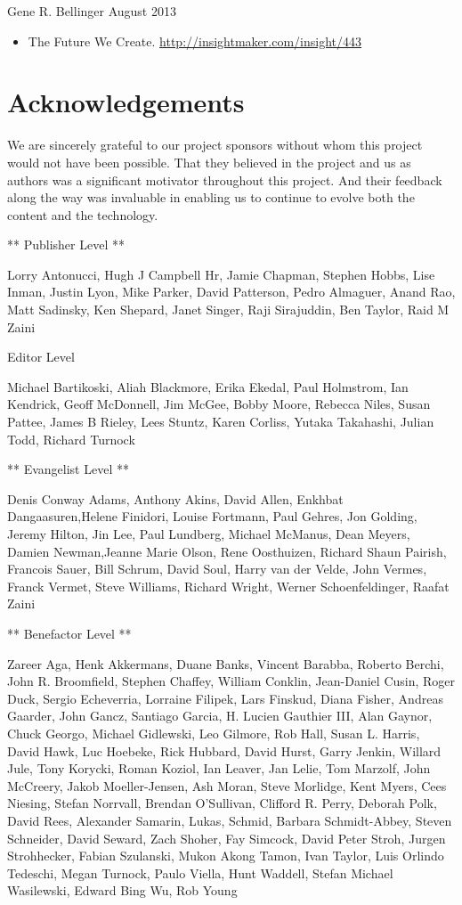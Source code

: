 \documentclass[]{memoir}
\begin{document}
Gene R. Bellinger August 2013

\begin{itemize}
\itemsep1pt\parskip0pt
\item
  The Future We Create. \url{http://insightmaker.com/insight/443}
\end{itemize}

\chapter{Acknowledgements}

We are sincerely grateful to our project sponsors without whom this
project would not have been possible. That they believed in the project
and us as authors was a significant motivator throughout this project.
And their feedback along the way was invaluable in enabling us to
continue to evolve both the content and the technology.

** Publisher Level **

Lorry Antonucci, Hugh J Campbell Hr, Jamie Chapman, Stephen Hobbs, Lise
Inman, Justin Lyon, Mike Parker, David Patterson, Pedro Almaguer, Anand
Rao, Matt Sadinsky, Ken Shepard, Janet Singer, Raji Sirajuddin, Ben
Taylor, Raid M Zaini

Editor Level

Michael Bartikoski, Aliah Blackmore, Erika Ekedal, Paul Holmstrom, Ian
Kendrick, Geoff McDonnell, Jim McGee, Bobby Moore, Rebecca Niles, Susan
Pattee, James B Rieley, Lees Stuntz, Karen Corliss, Yutaka Takahashi,
Julian Todd, Richard Turnock

** Evangelist Level **

Denis Conway Adams, Anthony Akins, David Allen, Enkhbat
Dangaasuren,Helene Finidori, Louise Fortmann, Paul Gehres, Jon Golding,
Jeremy Hilton, Jin Lee, Paul Lundberg, Michael McManus, Dean Meyers,
Damien Newman,Jeanne Marie Olson, Rene Oosthuizen, Richard Shaun
Pairish, Francois Sauer, Bill Schrum, David Soul, Harry van der Velde,
John Vermes, Franck Vermet, Steve Williams, Richard Wright, Werner
Schoenfeldinger, Raafat Zaini

** Benefactor Level **

Zareer Aga, Henk Akkermans, Duane Banks, Vincent Barabba, Roberto
Berchi, John R. Broomfield, Stephen Chaffey, William Conklin,
Jean-Daniel Cusin, Roger Duck, Sergio Echeverria, Lorraine Filipek, Lars
Finskud, Diana Fisher, Andreas Gaarder, John Gancz, Santiago Garcia, H.
Lucien Gauthier III, Alan Gaynor, Chuck Georgo, Michael Gidlewski, Leo
Gilmore, Rob Hall, Susan L. Harris, David Hawk, Luc Hoebeke, Rick
Hubbard, David Hurst, Garry Jenkin, Willard Jule, Tony Korycki, Roman
Koziol, Ian Leaver, Jan Lelie, Tom Marzolf, John McCreery, Jakob
Moeller-Jensen, Ash Moran, Steve Morlidge, Kent Myers, Cees Niesing,
Stefan Norrvall, Brendan O'Sullivan, Clifford R. Perry, Deborah Polk,
David Rees, Alexander Samarin, Lukas, Schmid, Barbara Schmidt-Abbey,
Steven Schneider, David Seward, Zach Shoher, Fay Simcock, David Peter
Stroh, Jurgen Strohhecker, Fabian Szulanski, Mukon Akong Tamon, Ivan
Taylor, Luis Orlindo Tedeschi, Megan Turnock, Paulo Viella, Hunt
Waddell, Stefan Michael Wasilewski, Edward Bing Wu, Rob Young
\end{document}
